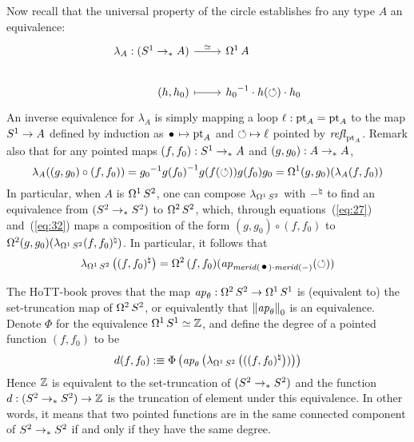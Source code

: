 \documentclass[english,a4]{article}
\begin{document}
Now recall that the universal property of the circle establishes fro
any type $A$ an equivalence:
\begin{equation}
  \label{eq:25}
  \begin{tikzcd}[%
    /tikz/column 1/.append style={anchor=base east},%
    /tikz/column 2/.append style={anchor=base west}]
    \lambda_{A}: (\Sc \ptdto A) \rar["\weq"] & \loopspace 1 A
    \\
    (h,h_0) \rar[mapsto] & \inv{h_0} \cdot h(\Sloop)\cdot h_0
  \end{tikzcd}
\end{equation}
An inverse equivalence for $\lambda_A$ is simply mapping a loop
$\ell : {\mathord{\mathrm{pt}}}_A = {\mathord{\mathrm{pt}}}_A$ to the map ${S^1} \to A$ defined by induction as
$\base \mapsto \pt_A$ and $\mathord{\circlearrowleft} \mapsto \ell$ pointed by
$\mathop{{\mathit{refl}}_{{\mathord{\mathrm{pt}}}_A}}$. Remark also that for any pointed maps
$(f,f_0):{S^1} \to_\ast A$ and $(g,g_0):A \to_\ast A$,
\begin{equation}
  \label{eq:32}
  \lambda_A((g,g_0)\circ (f,f_0)) = {g_0}^{-1} {g(f_0)}^{-1} g(f(\mathord{\circlearrowleft})) g(f_0) g_0
  = \mathop{\Omega^{1}} (g,g_0) ( \lambda_A(f,f_0) )
\end{equation}
In particular, when $A$ is $\mathop{\Omega^{1}} {S^2}$, one can compose
$\lambda_{\mathop{\Omega^{1}} {S^2}}$ with $\mathord{-}^\natural$ to find an
equivalence from $({S^2} \to_\ast {S^2})$ to $\mathop{\Omega^{2}} {S^2}$, which,
through equations~(\ref{eq:27}) and~(\ref{eq:32}) maps a composition
of the form $(g,g_0)\circ (f,f_0)$ to
$\mathop{\Omega^{2}} (g,g_0)(\lambda_{\mathop{\Omega^{1}} {S^2}}(f,f_0)^\natural)$. In
particular, it follows that
\begin{equation}
  \label{eq:34}
  \lambda_{\loopspace 1 \Sp}\left((f,f_0)^\natural\right) = \loopspace 2 {(f,f_0)} (\ap{\mrd(\base)\cdot \mrd(\blank)}(\Sloop))
\end{equation}

The HoTT-book proves that the map
$\mathop{{\it ap}_{\theta}}:\mathop{\Omega^{2}} {S^2} \to \mathop{\Omega^{1}} {S^1}$ is (equivalent to)
the set-truncation map of $\mathop{\Omega^{2}} {S^2}$, or equivalently that
${\lVert\mathop{{\it ap}_{\theta}}\rVert}_0$ is an equivalence. Denote $\Phi$ for the
equivalence $\mathop{\Omega^{1}} {S^1} \simeq \mathbb{Z}$, and define the degree of a
pointed function $(f,f_0)$ to be
\begin{equation}
  \label{eq:28}
  d(f,f_0) \mathrel{\hbox{:}\mkern-5mu\equiv} \Phi\left(\mathop{{\it ap}_{\theta}}\left(
      \lambda_{\mathop{\Omega^{1}} {S^2}}\left(((f,f_0)^\natural\right))
    \right)\right)
\end{equation}
Hence $\mathbb{Z}$ is equivalent to the set-truncation of $({S^2} \to_\ast {S^2})$
and the function $d: ({S^2} \to_\ast {S^2}) \to \mathbb{Z}$ is the truncation of
element under this equivalence. In other words, it means that two
pointed functions are in the same connected component of
${S^2} \to_\ast {S^2}$ if and only if they have the same degree.
\end{document}
